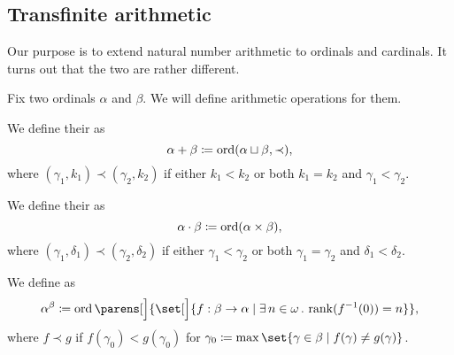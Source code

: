 \subsection{Transfinite arithmetic}\label{subsec:ordinal_and_cardinal_arithmetic}

Our purpose is to extend natural number arithmetic to ordinals and cardinals. It turns out that the two are rather different.

\begin{definition}\label{def:ordinal_arithmetic}
  Fix two ordinals \( \alpha \) and \( \beta \). We will define arithmetic operations for them.

  \begin{thmenum}
     We define their  as
    \begin{equation*}
      \alpha + \beta \coloneqq \operatorname{ord}(\alpha \sqcup \beta, \prec),
    \end{equation*}
    where \( (\gamma_1, k_1) \prec (\gamma_2, k_2) \) if either \( k_1 < k_2 \) or both \( k_1 = k_2 \) and \( \gamma_1 < \gamma_2 \).

     We define their  as
    \begin{equation*}
      \alpha \cdot \beta \coloneqq \operatorname{ord}(\alpha \times \beta),
    \end{equation*}
    where \( (\gamma_1, \delta_1) \prec (\gamma_2, \delta_2) \) if either \( \gamma_1 < \gamma_2 \) or both \( \gamma_1 = \gamma_2 \) and \( \delta_1 < \delta_2 \).

     We define  as
    \begin{equation*}
      \alpha^\beta \coloneqq \ord\parens[\Big]{ \set[\Big]{ f: \beta \to \alpha \given \qexists {n \in \omega} \rank(f^{-1}(0)) = n } },
    \end{equation*}
    where \( f \prec g \) if \( f(\gamma_0) < g(\gamma_0) \) for \( \gamma_0 \coloneqq \max\set{ \gamma \in \beta \given f(\gamma) \neq g(\gamma) } \).
  \end{thmenum}
\end{definition}


